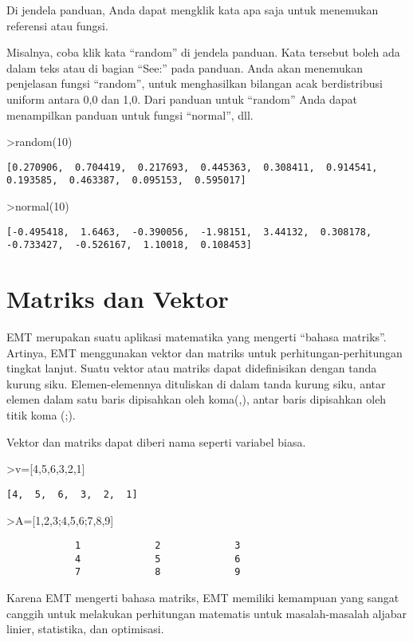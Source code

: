 \documentclass[
]{book}
\begin{document}
Di jendela panduan, Anda dapat mengklik kata apa saja untuk menemukan referensi atau fungsi.

Misalnya, coba klik kata ``random'' di jendela panduan. Kata tersebut boleh ada dalam teks atau di bagian ``See:'' pada panduan. Anda akan menemukan penjelasan fungsi ``random'', untuk menghasilkan bilangan acak berdistribusi uniform antara 0,0 dan 1,0. Dari panduan untuk ``random'' Anda dapat menampilkan panduan untuk fungsi ``normal'', dll.

\textgreater random(10)

\begin{verbatim}
[0.270906,  0.704419,  0.217693,  0.445363,  0.308411,  0.914541,
0.193585,  0.463387,  0.095153,  0.595017]
\end{verbatim}

\textgreater normal(10)

\begin{verbatim}
[-0.495418,  1.6463,  -0.390056,  -1.98151,  3.44132,  0.308178,
-0.733427,  -0.526167,  1.10018,  0.108453]
\end{verbatim}

\chapter{Matriks dan Vektor}\label{matriks-dan-vektor}

EMT merupakan suatu aplikasi matematika yang mengerti ``bahasa matriks''. Artinya, EMT menggunakan vektor dan matriks untuk perhitungan-perhitungan tingkat lanjut. Suatu vektor atau matriks dapat didefinisikan dengan tanda kurung siku. Elemen-elemennya dituliskan di dalam tanda kurung siku, antar elemen dalam satu baris dipisahkan oleh koma(,), antar baris dipisahkan oleh titik koma (;).

Vektor dan matriks dapat diberi nama seperti variabel biasa.

\textgreater v={[}4,5,6,3,2,1{]}

\begin{verbatim}
[4,  5,  6,  3,  2,  1]
\end{verbatim}

\textgreater A={[}1,2,3;4,5,6;7,8,9{]}

\begin{verbatim}
            1             2             3 
            4             5             6 
            7             8             9 
\end{verbatim}

Karena EMT mengerti bahasa matriks, EMT memiliki kemampuan yang sangat canggih untuk melakukan perhitungan matematis untuk masalah-masalah aljabar linier, statistika, dan optimisasi.
\end{document}
